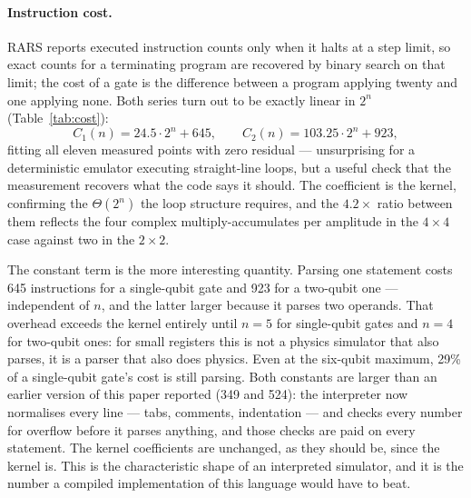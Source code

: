 \documentclass[11pt]{article}
\begin{document}
\paragraph{Instruction cost.} RARS reports executed instruction counts only when it halts at
a step limit, so exact counts for a terminating program are recovered by binary search on
that limit; the cost of a gate is the difference between a program applying twenty and one
applying none. Both series turn out to be exactly linear in $2^n$ (Table~\ref{tab:cost}):
\[
  C_1(n) = 24.5 \cdot 2^n + 645, \qquad C_2(n) = 103.25 \cdot 2^n + 923 ,
\]
fitting all eleven measured points with zero residual --- unsurprising for a deterministic
emulator executing straight-line loops, but a useful check that the measurement recovers
what the code says it should. The coefficient is the kernel, confirming the $\Theta(2^n)$
the loop structure requires, and the $4.2\times$ ratio between them reflects the four
complex multiply-accumulates per amplitude in the $4\times4$ case against two in the
$2\times2$.

The constant term is the more interesting quantity. Parsing one statement costs 645
instructions for a single-qubit gate and 923 for a two-qubit one --- independent of $n$,
and the latter larger because it parses two operands. That overhead exceeds the kernel
entirely until $n = 5$ for single-qubit gates and $n = 4$ for two-qubit ones: for small
registers this is not a physics simulator that also parses, it is a parser that also does
physics. Even at the six-qubit maximum, 29\% of a single-qubit gate's cost is still
parsing. Both constants are larger than an earlier version of this paper reported (349 and
524): the interpreter now normalises every line --- tabs, comments, indentation --- and
checks every number for overflow before it parses anything, and those checks are paid on
every statement. The kernel coefficients are unchanged, as they should be, since the
kernel is. This is the characteristic shape of an interpreted simulator, and it is the
number a compiled implementation of this language would have to beat.
\end{document}
